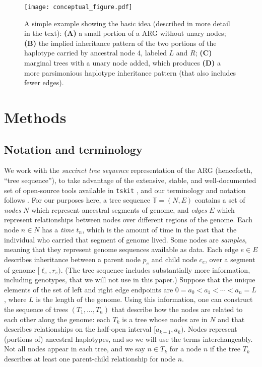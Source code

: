 \documentclass[10pt,twoside,lineno]{gsajnl}
\newcommand{\T}{\mathbb{T}}
\newcommand{\tskit}{\texttt{tskit}}
\begin{document}
\begin{figure}
    \begin{center}
    \texttt{[image: conceptual\_figure.pdf]}
    \end{center}
    \caption{
        A simple example showing the basic idea
        (described in more detail in the text):
        \textbf{(A)} a small portion of a ARG without unary nodes;
        \textbf{(B)} the implied inheritance pattern of the two portions of the haplotype carried by ancestral node 4,
        labeled $L$ and $R$;
        \textbf{(C)} marginal trees with a unary node added,
        which produces \textbf{(D)} a more parsimonious haplotype inheritance pattern
        (that also includes fewer edges).
        \label{fig:conceptual}
    }
\end{figure}

\section{Methods}

\subsection{Notation and terminology}

We work with the \emph{succinct tree sequence} representation of the ARG (henceforth, ``tree sequence''),
to take advantage of the extensive, stable, and well-documented set of open-source tools
available in \tskit{} \citep{tskit}, 
and our terminology and notation follows \citet{ralph2020efficiently}.
For our purposes here,
a tree sequence $\T = (N, E)$ contains a set of \emph{nodes} $N$ 
which represent ancestral segments of genome,
and \emph{edges} $E$ which represent relationships between nodes over different regions of the genome.
Each node $n \in N$ has a \emph{time} $t_n$,
which is the amount of time in the past that the individual who carried that segment of genome lived.
Some nodes are \emph{samples}, meaning that they represent genome sequences available as data.
Each edge $e \in E$ describes inheritance between a parent node $p_e$ and child node $c_e$,
over a segment of genome $[\ell_e, r_e)$.
(The tree sequence includes substantially more information, including genotypes, that we will not use in this paper.)
Suppose that the unique elements of the set of left and right edge endpoints
are $0 = a_0 < a_1 < \cdots < a_{n} = L$, where $L$ is the length of the genome.
Using this information, one can construct the sequence of 
trees $\left(T_1,...,T_{n}\right)$ that describe how the nodes are related to each other along the genome:
each $T_k$ is a tree whose nodes are in $N$
and that describes relationships on the half-open interval $[a_{k-1}, a_k)$.
Nodes represent (portions of) ancestral haplotypes, and so
we will use the terms interchangeably.
Not all nodes appear in each tree,
and we say $n \in T_k$ for a node $n$ if the tree $T_k$ describes at least one parent-child relationship
for node $n$.
\end{document}
